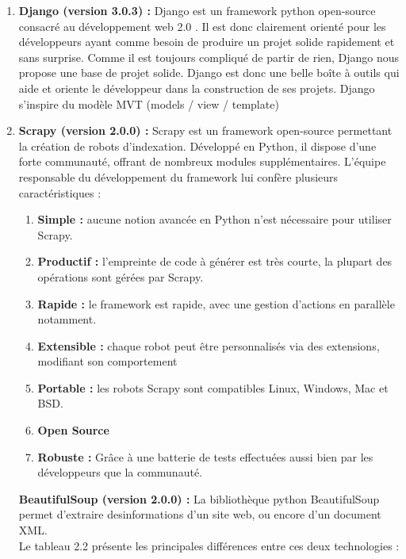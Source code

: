 \begin{enumerate}
\item \textbf{Django (version 3.0.3) \cite{django} :}
Django est un framework python open-source consacré au développement web 2.0 . Il est donc clairement orienté pour les développeurs ayant comme besoin de produire un projet solide rapidement et sans surprise. Comme il est toujours compliqué de partir de rien, Django nous propose une base de projet solide. Django est donc une belle boîte à outils qui aide et oriente le développeur dans la construction de ses projets.
Django s'inspire du modèle MVT (models / view / template)

\item \textbf{Scrapy (version 2.0.0) \cite{scrapy} :}
Scrapy est un framework open-source permettant la création de robots d'indexation. Développé en Python, il dispose d'une forte communauté, offrant de nombreux modules supplémentaires.
L'équipe responsable du développement du framework lui confère plusieurs caractéristiques :
\begin{enumerate}
\item \textbf{Simple :} aucune notion avancée en Python n'est nécessaire pour utiliser Scrapy.
\item \textbf{Productif :} l'empreinte de code à générer est très courte, la plupart des opérations sont gérées par Scrapy.
\item \textbf{Rapide :} le framework est rapide, avec une gestion d'actions en parallèle notamment.
\item \textbf{Extensible :} chaque robot peut être personnalisés via des extensions, modifiant son comportement
\item \textbf{Portable :} les robots Scrapy sont compatibles Linux, Windows, Mac et BSD.
\item \textbf{Open Source}
\item \textbf{Robuste :} Grâce à une batterie de tests effectuées aussi bien par les développeurs que la communauté.
\end{enumerate}

\textbf{BeautifulSoup (version 2.0.0) \cite{beautifulsoup} :} La bibliothèque python BeautifulSoup permet d’extraire desinformations d’un site web, ou encore d’un document XML.\\
Le tableau 2.2 présente les principales différences entre ces deux technologies :

\begin{table}[H]
\centering
\begin{tabular}[h]{|l|p{3cm}|p{3cm}|l|p{3cm}|l}



\end{tabular}
\end{table}
\end{enumerate}
